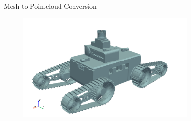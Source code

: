 \documentclass[12pt]{beamer}
\begin{document}
\begin{frame}{Mesh to Pointcloud Conversion}
  \begin{figure}[H]
    \centering
    \includegraphics[width=0.8\textwidth]{fig/full_marv_mesh.png}
    \label{fig:full_marv_mesh}
  \end{figure}
\end{frame}
\end{document}
